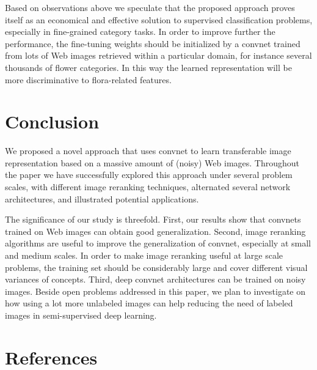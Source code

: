 \documentclass[preprint,12pt]{elsarticle}
\begin{document}
Based on observations above we speculate that the proposed approach proves itself as an economical and effective solution to supervised classification problems, especially in fine-grained category tasks. In order to improve further the performance, the fine-tuning weights should be initialized by a convnet trained from lots of Web images retrieved within a particular domain, for instance several thousands of flower categories. In this way the learned representation will be more discriminative to flora-related features. 

\section{Conclusion}\label{sec:conclu}
We proposed a novel approach that uses convnet to learn transferable image representation based on a  massive amount of (noisy) Web images. Throughout the paper we have successfully explored this approach under several problem scales, with different image reranking techniques, alternated several network architectures, and illustrated potential applications.

The significance of our study is threefold. First, our results show that convnets trained on Web images can obtain good generalization. Second, image reranking algorithms are useful to improve the generalization of convnet, especially at small and medium scales. In order to make image reranking useful at large scale problems, the training set should be considerably large and cover different visual variances of concepts. Third, deep convnet architectures can be trained on noisy images. Beside open problems addressed in this paper, we plan to investigate on how using a lot more unlabeled images can help reducing the need of labeled images in semi-supervised deep learning.

\section{References}
 
\end{document}
